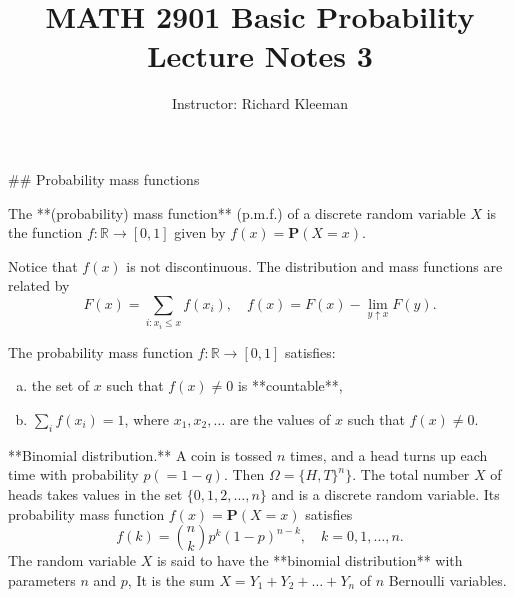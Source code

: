 


\title{MATH 2901 Basic Probability Lecture Notes 3}
\author{Instructor: Richard Kleeman}
\date{}
\maketitle


## Probability mass functions
\begin{definition}
The **(probability) mass function** (p.m.f.) of a discrete random variable $X$ is the function $f: \mathbb{R} \to[0, 1]$ given by $f(x) = \mathbf{P}(X = x)$. 
\end{definition}

Notice that $f(x)$ is not discontinuous. The distribution and mass functions are related by
\begin{equation*}
    F(x) = \sum_{i: x_i \leq x} f(x_i), \quad f(x) = F(x) - \lim_{y\uparrow x} F(y).
\end{equation*}

\begin{lemma}
The probability mass function $f: \mathbb{R} \to [0, 1]$ satisfies: 
\begin{enumerate}[(a)]
    \item the set of $x$ such that $f(x) \neq 0$ is **countable**,
    \item $\sum_{i} f(x_i) = 1$, where $x_1, x_2, \dots$ are the values of $x$ such that $f(x)\neq 0$.
\end{enumerate}
\end{lemma}

\begin{example}
**Binomial distribution.** A coin is tossed $n$ times, and a head turns up each time with probability $p (= 1 - q)$. Then $\Omega = \{H, T\}^n \}$. The total number $X$ of heads takes values in the set $\{0, 1, 2, \dots , n\}$ and is a discrete random variable. Its probability mass function $f(x) = \mathbf{P}(X = x)$ satisfies 
\begin{equation*}
    f(k)= \binom{n}{k} p^{k}(1-p)^{n-k}, \quad k=0,1, \ldots, n.
\end{equation*}
The random variable $X$ is said to have the **binomial distribution** with parameters $n$ and $p$, It is the sum $X = Y_1 + Y_2 + \dots + Y_n$ of $n$ Bernoulli variables.
\end{example}

